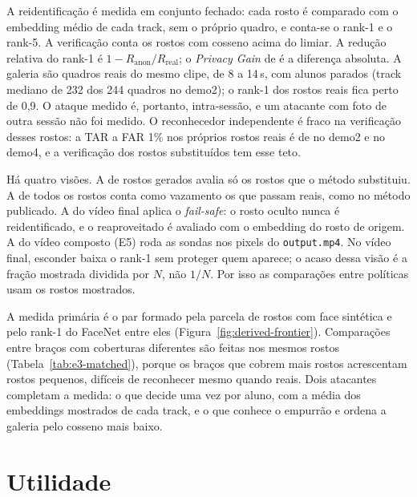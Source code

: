 A reidentificação é medida em conjunto fechado: cada rosto é comparado com o embedding médio de cada track, sem o próprio quadro, e conta-se o rank-1 e o rank-5. A verificação conta os rostos com cosseno acima do limiar. A redução relativa do rank-1 é $1 - R_{\mathrm{anon}}/R_{\mathrm{real}}$; o \emph{Privacy Gain} de \citet{meden} é a diferença absoluta. A galeria são quadros reais do mesmo clipe, de 8 a 14\,s, com alunos parados (track mediano de 232 dos 244 quadros no demo2); o rank-1 dos rostos reais fica perto de 0,9. O ataque medido é, portanto, intra-sessão, e um atacante com foto de outra sessão não foi medido. O reconhecedor independente é fraco na verificação desses rostos: a TAR a FAR 1\% nos próprios rostos reais é de  no demo2 e  no demo4, e a verificação dos rostos substituídos tem esse teto.

Há quatro visões. A de rostos gerados avalia só os rostos que o método substituiu. A de todos os rostos conta como vazamento os que passam reais, como no método publicado. A do vídeo final aplica o \emph{fail-safe}: o rosto oculto nunca é reidentificado, e o reaproveitado é avaliado com o embedding do rosto de origem. A do vídeo composto (E5) roda as sondas nos pixels do \texttt{output.mp4}. No vídeo final, esconder baixa o rank-1 sem proteger quem aparece; o acaso dessa visão é a fração mostrada dividida por $N$, não $1/N$. Por isso as comparações entre políticas usam os rostos mostrados.

A medida primária é o par formado pela parcela de rostos com face sintética e pelo rank-1 do FaceNet entre eles (Figura~\ref{fig:derived-frontier}). Comparações entre braços com coberturas diferentes são feitas nos mesmos rostos (Tabela~\ref{tab:e3-matched}), porque os braços que cobrem mais rostos acrescentam rostos pequenos, difíceis de reconhecer mesmo quando reais. Dois atacantes completam a medida: o que decide uma vez por aluno, com a média dos embeddings mostrados de cada track, e o que conhece o empurrão e ordena a galeria pelo cosseno mais baixo.

\section{Utilidade}

